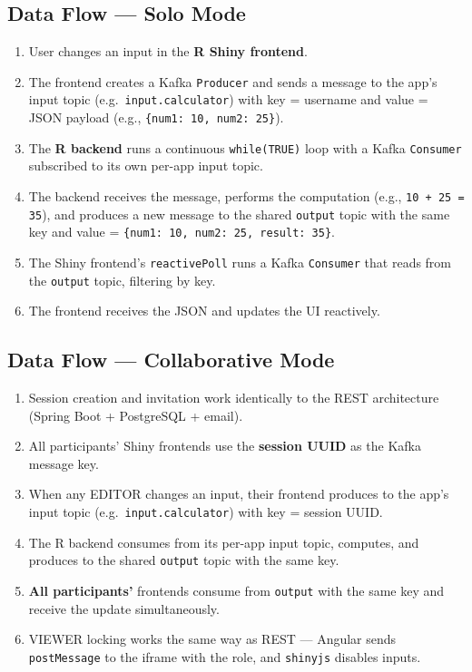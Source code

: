 \documentclass[12pt,a4paper]{article}
\begin{document}
\subsection{Data Flow --- Solo Mode}

\begin{enumerate}[nosep]
  \item User changes an input in the \textbf{R Shiny frontend}.
  \item The frontend creates a Kafka \texttt{Producer} and sends a message to the app's input topic (e.g.\ \texttt{input.calculator}) with key = username and value = JSON payload (e.g., \texttt{\{num1: 10, num2: 25\}}).
  \item The \textbf{R backend} runs a continuous \texttt{while(TRUE)} loop with a Kafka \texttt{Consumer} subscribed to its own per-app input topic.
  \item The backend receives the message, performs the computation (e.g., \texttt{10 + 25 = 35}), and produces a new message to the shared \texttt{output} topic with the same key and value = \texttt{\{num1: 10, num2: 25, result: 35\}}.
  \item The Shiny frontend's \texttt{reactivePoll} runs a Kafka \texttt{Consumer} that reads from the \texttt{output} topic, filtering by key.
  \item The frontend receives the JSON and updates the UI reactively.
\end{enumerate}

\subsection{Data Flow --- Collaborative Mode}

\begin{enumerate}[nosep]
  \item Session creation and invitation work identically to the REST architecture (Spring Boot + PostgreSQL + email).
  \item All participants' Shiny frontends use the \textbf{session UUID} as the Kafka message key.
  \item When any EDITOR changes an input, their frontend produces to the app's input topic (e.g.\ \texttt{input.calculator}) with key = session UUID.
  \item The R backend consumes from its per-app input topic, computes, and produces to the shared \texttt{output} topic with the same key.
  \item \textbf{All participants'} frontends consume from \texttt{output} with the same key and receive the update simultaneously.
  \item VIEWER locking works the same way as REST --- Angular sends \texttt{postMessage} to the iframe with the role, and \texttt{shinyjs} disables inputs.
\end{enumerate}
\end{document}
